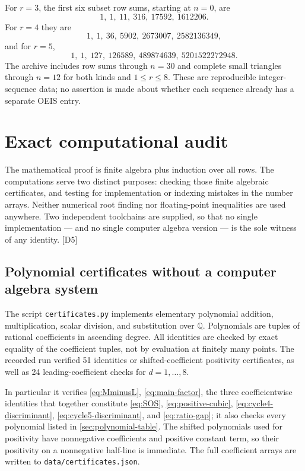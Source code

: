 \documentclass[11pt,a4paper]{article}
\numberwithin{equation}{section}
\theoremstyle{definition}
\theoremstyle{remark}
\newcommand{\Q}{\mathbb Q}
\newcommand{\dup}[1]{{\small\textsf{\color{MutedInk}[#1]}}}
\begin{document}
For $r=3$, the first six subset row sums, starting at $n=0$, are
\[
 1,\ 1,\ 11,\ 316,\ 17592,\ 1612206.
\]
For $r=4$ they are
\[
 1,\ 1,\ 36,\ 5902,\ 2673007,\ 2582136349,
\]
and for $r=5$,
\[
 1,\ 1,\ 127,\ 126589,\ 489874639,\ 5201522272948.
\]
The archive includes row sums through $n=30$ and complete small triangles
through $n=12$ for both kinds and $1\le r\le8$. These are reproducible
integer-sequence data; no assertion is made about whether each sequence
already has a separate OEIS entry.

\section{Exact computational audit}\label{sec:verification}

The mathematical proof is finite algebra plus induction over all rows.
The computations serve two distinct purposes: checking those finite
algebraic certificates, and testing for implementation or indexing mistakes
in the number arrays. Neither numerical root finding nor floating-point
inequalities are used anywhere. Two independent toolchains are supplied,
so that no single implementation --- and no single computer algebra
version --- is the sole witness of any identity. \dup{D5}

\subsection{Polynomial certificates without a computer algebra system}

The script \texttt{certificates.py} implements elementary polynomial
addition, multiplication, scalar division, and substitution over $\Q$.
Polynomials are tuples of rational coefficients in ascending degree.
All identities are checked by exact equality of the coefficient tuples,
not by evaluation at finitely many points. The recorded run verified
51 identities or shifted-coefficient positivity certificates, as well as
24 leading-coefficient checks for $d=1,\ldots,8$.

In particular it verifies \eqref{eq:MminusL}, \eqref{eq:main-factor},
the three coefficientwise identities that together constitute
\eqref{eq:SOS}, \eqref{eq:positive-cubic},
\eqref{eq:cycle4-discriminant}, \eqref{eq:cycle5-discriminant}, and
\eqref{eq:ratio-gap}; it also checks every polynomial listed in
\cref{sec:polynomial-table}. The shifted polynomials used for positivity
have nonnegative coefficients and positive constant term, so their
positivity on a nonnegative half-line is immediate. The full coefficient
arrays are written to \texttt{data/certificates.json}.
\end{document}
